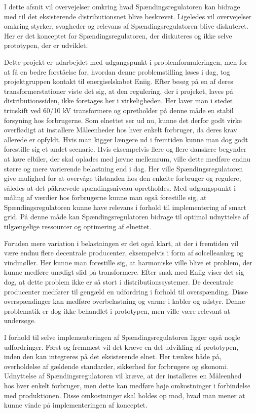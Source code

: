 

I dette afsnit vil overvejelser omkring hvad Spændingsregulatoren kan bidrage med til det eksisterende distributionsnet blive beskrevet. Ligeledes vil overvejelser omkring styrker, svagheder og relevans af Spændingsregulatoren blive diskuteret. Her er det konceptet for Spændingsregulatoren, der diskuteres og ikke selve prototypen, der er udviklet. 

Dette projekt er udarbejdet med udgangspunkt i problemformuleringen, men for at få en bedre forståelse for, hvordan denne problemstilling løses i dag, tog projektgruppen kontakt til energiselskabet Eniig. Efter besøg på en af deres transformerstationer viste det sig, at den regulering, der i projeket, laves på distributionssiden, ikke foretages her i virkeligheden. Her laver man i stedet trinskift ved 60/10 kV transformere og opretholder på denne måde en stabil forsyning hos forbrugerne. Som elnettet ser ud nu, kunne det derfor godt virke overflødigt at installere Måleenheder hos hver enkelt forbruger, da deres krav allerede er opfyldt. Hvis man kigger længere ud i fremtiden kunne man dog godt forestille sig et andet scenarie. Hvis eksempelvis flere og flere danskere begynder at køre elbiler, der skal oplades med jævne mellemrum, ville dette medføre endnu større og mere varierende belastning end i dag. Her ville Spændingsregulatoren give mulighed for at overvåge tilstanden hos den enkelte forbruger og regulere, således at det påkrævede spændingsniveau opretholdes. 
Med udgangspunkt i måling af værdier hos forbrugerne kunne man også forestille sig, at Spændingsregulatoren kunne have relevans i forhold til implementering af smart grid. På denne måde kan Spændingsregulatoren bidrage til optimal udnyttelse af tilgængelige ressourcer og optimering af elnettet. 

Foruden mere variation i belastningen er det også klart, at der i fremtiden vil være endnu flere decentrale producenter, eksempelvis i form af solcelleanlæg og vindmøller. Her kunne man forestille sig, at harmoniske ville blive et problem, der kunne medføre unødigt slid på transformere. Efter snak med Eniig viser det sig dog, at dette problem ikke er så stort i distributionssystemer. De decentrale producenter medfører til gengæld en udfordring i forhold til overspænding. Disse overspændinger kan medføre overbelastning og varme i kabler og udstyr. Denne problematik er dog ikke behandlet i prototypen, men ville være relevant at undersøge.

I forhold til selve implementeringen af Spændingsregulatoren ligger også nogle udfordringer. Først og fremmest vil det kræve en del udvikling af prototypen, inden den kan integreres på det eksisterende elnet. Her tænkes både på, overholdelse af gældende standarder, sikkerhed for forbrugere og økonomi. Udnyttelse af Spændingsregulatoren vil kræve, at der installeres en Måleenhed hos hver enkelt forbruger, men dette kan medføre høje omkostninger i forbindelse med produktionen. Disse omkostninger skal holdes op mod, hvad man mener at kunne vinde på implementeringen af konceptet. 


